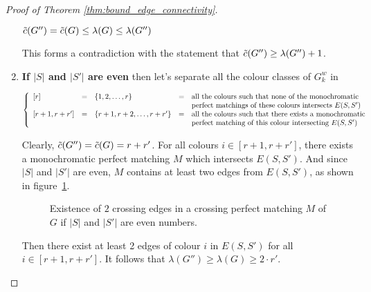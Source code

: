 \begin{proof}[Proof of Theorem \ref{thm:bound_edge_connectivity}]
\begin{enumerate}
            \begin{center}
                $\Tilde{c}(G'') = \Tilde{c}(G) \leq \lambda(G) \leq \lambda(G'')$
            \end{center}
            
            This forms a contradiction with the statement that $\Tilde{c}(G'') \geq \lambda(G'') + 1$.
            
        \item
            \textbf{If $|S|$ and $|S'|$ are even} then let's separate all the colour classes of $G_k^w$ in
            
            \begin{center}
                $\left\{ \begin{array}{l c l c l}
                    [r]             & = & \{1, 2, \dots, r\}              & = & \mbox{all the colours such that none of the monochromatic} \\
                                    &   &                                 &   & \mbox{perfect matchings of these colours intersects } E(S, S') \\ 
                    {[r + 1, r + r']} & = & \{r + 1, r + 2, \dots, r + r'\} & = & \mbox{all the colours such that there exists a monochromatic} \\
                                    &   &                                 &   & \mbox{perfect matching of this colour intersecting } E(S, S')
                \end{array} \right.$
            \end{center}
            
            Clearly, $\Tilde{c}(G'') = \Tilde{c}(G) = r + r'$.
            For all colours $i \in [r + 1, r + r']$, there exists a monochromatic perfect matching $M$ which intersects $E(S, S')$.
            And since $|S|$ and $|S'|$ are even, $M$ contains at least two edges from $E(S, S')$, as shown in figure~\ref{fig:proof_lambda_even}.
            
            \begin{figure}[H]
                \caption{Existence of $2$ crossing edges in a crossing perfect matching $M$ of $G$ if $|S|$ and $|S'|$ are even numbers.}
                \label{fig:proof_lambda_even}
            \end{figure}
            
            Then there exist at least 2 edges of colour $i$ in $E(S, S')$ for all $i \in [r + 1, r + r']$.
            It follows that $\lambda(G'') \geq \lambda(G) \geq 2 \cdot r'$.
            

\end{enumerate}
\end{proof}
